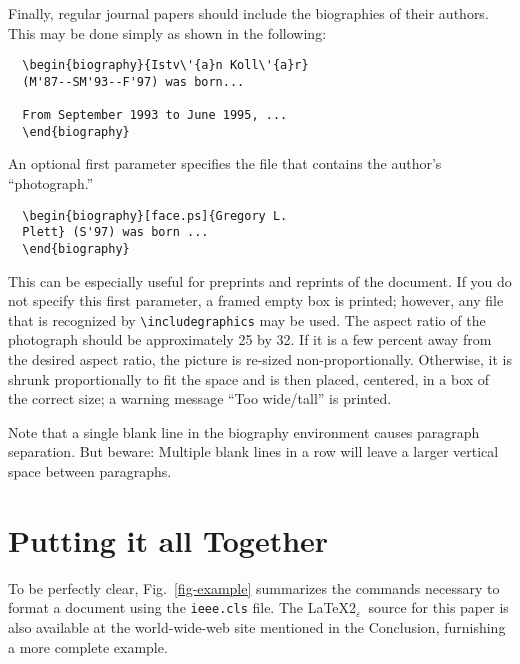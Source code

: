 \documentclass[%
	final,
	reprint,
	notitlepage,
	narroweqnarray,
	inline,
	twoside,
        invited,
	]{ieee}
\newcommand{\latexiie}{\LaTeX2{\Large$_\varepsilon$}}
\begin{document}
Finally, regular journal papers should include the biographies of
their authors.  This may be done simply as shown in the following:
\begin{verbatim}
  \begin{biography}{Istv\'{a}n Koll\'{a}r} 
  (M'87--SM'93--F'97) was born...

  From September 1993 to June 1995, ... 
  \end{biography}
\end{verbatim}
An optional first parameter specifies the file that contains the 
author's ``photograph.''
\begin{verbatim}
  \begin{biography}[face.ps]{Gregory L. 
  Plett} (S'97) was born ...
  \end{biography}
\end{verbatim}
This can be especially useful for preprints and reprints of the
document.  If you do not specify this first parameter, a framed empty
box is printed; however, any file that is recognized by
\verb|\includegraphics| may be used.  The aspect ratio of the
photograph should be approximately 25 by 32.  If it is a few percent
away from the desired aspect ratio, the picture is re-sized
non-proportionally.  Otherwise, it is shrunk proportionally to fit the
space and is then placed, centered, in a box of the correct size; a
warning message ``Too wide/tall'' is printed.

Note that a single blank line in the biography environment causes
paragraph separation. But beware: Multiple blank lines in a row will
leave a larger vertical space between paragraphs.

\section{Putting it all Together}

To be perfectly clear, Fig.~\ref{fig-example} summarizes the commands
necessary to format a document using the \texttt{ieee.cls} file. The
\latexiie\ source for this paper is also available at the
world-wide-web site mentioned in the Conclusion, furnishing a more
complete example.
\end{document}
